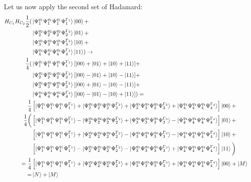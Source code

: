 \documentclass{article}
\begin{document}
Let us now apply the second set of Hadamard:
\begin{equation}
    \begin{split}
        H_{C_1}H_{C_2}\frac{1}{2}(
        &\ket{\Psi^{q_1}_1\Psi^{q_1}_1\Psi^{q_1}_1\Psi^{\Gamma_1}_1 }\ket{00}+\\
        &\ket{\Psi^{q_2}_2\Psi^{q_2}_2\Psi^{q_2}_2\Psi^{\Gamma_2}_2 }\ket{01}+\\
        &\ket{\Psi^{q_3}_3\Psi^{q_3}_3\Psi^{q_3}_3\Psi^{\Gamma_3}_3 }\ket{10}+\\
        &\ket{\Psi^{q_4}_4\Psi^{q_4}_4\Psi^{q_4}_4\Psi^{\Gamma_4}_4 }\ket{11}
        )\to\\
        \frac{1}{4}(
            &\ket{\Psi^{q_1}_1\Psi^{q_1}_1\Psi^{q_1}_1\Psi^{\Gamma_1}_1 }[\ket{00}+
            \ket{01}+
            \ket{10}+
            \ket{11}]+\\
            &\ket{\Psi^{q_2}_2\Psi^{q_2}_2\Psi^{q_2}_2\Psi^{\Gamma_2}_2 }[\ket{00}-
            \ket{01}+
            \ket{10}-
            \ket{11}]+\\
            &\ket{\Psi^{q_3}_3\Psi^{q_3}_3\Psi^{q_3}_3\Psi^{\Gamma_3}_3 }[\ket{00}+
            \ket{01}-
            \ket{10}-
            \ket{11}]+\\
            &\ket{\Psi^{q_4}_4\Psi^{q_4}_4\Psi^{q_4}_4\Psi^{\Gamma_4}_4 }[\ket{00}-
            \ket{01}-
            \ket{10}+
            \ket{11}]
    ) =\\ 
        \frac{1}{4}&\left[\ket{\Psi^{q_1}_1\Psi^{q_1}_1\Psi^{q_1}_1\Psi^{\Gamma_1}_1 }+\ket{\Psi^{q_2}_2\Psi^{q_2}_2\Psi^{q_2}_2\Psi^{\Gamma_2}_2 }+\ket{\Psi^{q_3}_3\Psi^{q_3}_3\Psi^{q_3}_3\Psi^{\Gamma_3}_3 }+\ket{\Psi^{q_4}_4\Psi^{q_4}_4\Psi^{q_4}_4\Psi^{\Gamma_4}_4 }\right]\ket{00}+\\
    \frac{1}{4}\bigg(&\left[\ket{\Psi^{q_1}_1\Psi^{q_1}_1\Psi^{q_1}_1\Psi^{\Gamma_1}_1 }-\ket{\Psi^{q_2}_2\Psi^{q_2}_2\Psi^{q_2}_2\Psi^{\Gamma_2}_2 }+\ket{\Psi^{q_3}_3\Psi^{q_3}_3\Psi^{q_3}_3\Psi^{\Gamma_3}_3 }-\ket{\Psi^{q_4}_4\Psi^{q_4}_4\Psi^{q_4}_4\Psi^{\Gamma_4}_4 }\right]\ket{01}+\\
        &\left[\ket{\Psi^{q_1}_1\Psi^{q_1}_1\Psi^{q_1}_1\Psi^{\Gamma_1}_1 }+\ket{\Psi^{q_2}_2\Psi^{q_2}_2\Psi^{q_2}_2\Psi^{\Gamma_2}_2 }-\ket{\Psi^{q_3}_3\Psi^{q_3}_3\Psi^{q_3}_3\Psi^{\Gamma_3}_3 }-\ket{\Psi^{q_4}_4\Psi^{q_4}_4\Psi^{q_4}_4\Psi^{\Gamma_4}_4 }\right]\ket{10}+\\
        &\left[\ket{\Psi^{q_1}_1\Psi^{q_1}_1\Psi^{q_1}_1\Psi^{\Gamma_1}_1 }-\ket{\Psi^{q_2}_2\Psi^{q_2}_2\Psi^{q_2}_2\Psi^{\Gamma_2}_2 }-\ket{\Psi^{q_3}_3\Psi^{q_3}_3\Psi^{q_3}_3\Psi^{\Gamma_3}_3 }+\ket{\Psi^{q_4}_4\Psi^{q_4}_4\Psi^{q_4}_4\Psi^{\Gamma_4}_4 }\right]\ket{11}
    \bigg) \\= 
        \frac{1}{4}&\left[\ket{\Psi^{q_1}_1\Psi^{q_1}_1\Psi^{q_1}_1\Psi^{\Gamma_1}_1 }+\ket{\Psi^{q_2}_2\Psi^{q_2}_2\Psi^{q_2}_2\Psi^{\Gamma_2}_2 }+\ket{\Psi^{q_3}_3\Psi^{q_3}_3\Psi^{q_3}_3\Psi^{\Gamma_3}_3 }+\ket{\Psi^{q_4}_4\Psi^{q_4}_4\Psi^{q_4}_4\Psi^{\Gamma_4}_4 }\right]\ket{00}+\ket{M}\\=&\ket{N}+\ket{M}
    \end{split}
\end{equation}
\end{document}
